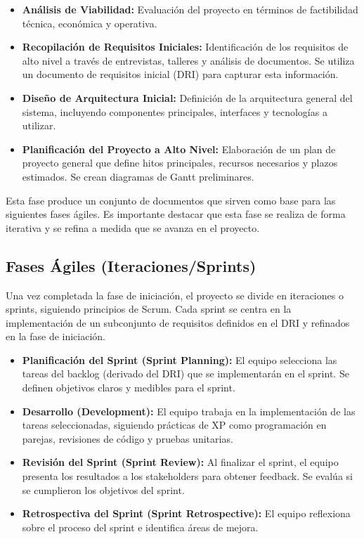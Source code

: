 \documentclass[12pt, spanish]{article}
\begin{document}
\begin{itemize}
    \item \textbf{Análisis de Viabilidad:} Evaluación del proyecto en términos de factibilidad técnica, económica y operativa.
    \item \textbf{Recopilación de Requisitos Iniciales:}  Identificación de los requisitos de alto nivel a través de entrevistas, talleres y análisis de documentos.  Se utiliza un documento de requisitos inicial (DRI) para capturar esta información.
    \item \textbf{Diseño de Arquitectura Inicial:} Definición de la arquitectura general del sistema, incluyendo componentes principales, interfaces y tecnologías a utilizar.
    \item \textbf{Planificación del Proyecto a Alto Nivel:}  Elaboración de un plan de proyecto general que define hitos principales, recursos necesarios y plazos estimados.  Se crean diagramas de Gantt preliminares.
\end{itemize}

Esta fase produce un conjunto de documentos que sirven como base para las siguientes fases ágiles.  Es importante destacar que esta fase se realiza de forma iterativa y se refina a medida que se avanza en el proyecto.

\subsection*{Fases Ágiles (Iteraciones/Sprints)}

Una vez completada la fase de iniciación, el proyecto se divide en iteraciones o sprints, siguiendo principios de Scrum.  Cada sprint se centra en la implementación de un subconjunto de requisitos definidos en el DRI y refinados en la fase de iniciación.

\begin{itemize}
    \item \textbf{Planificación del Sprint (Sprint Planning):}  El equipo selecciona las tareas del backlog (derivado del DRI) que se implementarán en el sprint. Se definen objetivos claros y medibles para el sprint.
    \item \textbf{Desarrollo (Development):} El equipo trabaja en la implementación de las tareas seleccionadas, siguiendo prácticas de XP como programación en parejas, revisiones de código y pruebas unitarias.
    \item \textbf{Revisión del Sprint (Sprint Review):}  Al finalizar el sprint, el equipo presenta los resultados a los stakeholders para obtener feedback. Se evalúa si se cumplieron los objetivos del sprint.
    \item \textbf{Retrospectiva del Sprint (Sprint Retrospective):} El equipo reflexiona sobre el proceso del sprint e identifica áreas de mejora.
\end{itemize}
\end{document}
